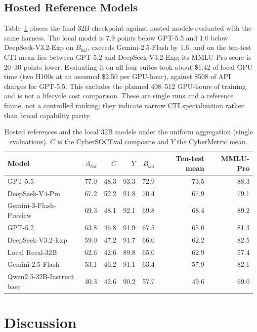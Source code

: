 \documentclass[conference]{IEEEtran}
\begin{document}
\subsection{Hosted Reference Models}
Table~\ref{tab:hosted} places the final 32B checkpoint against hosted models evaluated with the same harness. The local model is 7.9 points below GPT-5.5 and 1.0 below DeepSeek-V3.2-Exp on $B_{bal}$, exceeds Gemini-2.5-Flash by 1.6, and on the ten-test CTI mean lies between GPT-5.2 and DeepSeek-V3.2-Exp; its MMLU-Pro score is 20--30 points lower. Evaluating it on all four suites took about \$1.42 of local GPU time (two H100s at an assumed \$2.50 per GPU-hour), against \$508 of API charges for GPT-5.5. This excludes the planned 408--512 GPU-hours of training and is not a lifecycle cost comparison. These are single runs and a reference frame, not a controlled ranking; they indicate narrow CTI specialization rather than broad capability parity.

\begin{table}[t]
\caption{Hosted references and the local 32B models under the uniform aggregation (single evaluations). $C$ is the CyberSOCEval composite and $Y$ the CyberMetric mean.}
\label{tab:hosted}
\centering
\scriptsize
\setlength{\tabcolsep}{4.0pt}
\begin{tabular}{@{}lrrrrrr@{}}
\toprule
Model & $A_{bal}$ & $C$ & $Y$ & $B_{bal}$ & Ten-test mean & MMLU-Pro \\
\midrule
GPT-5.5 & 77.0 & 48.3 & 93.3 & 72.9 & 73.5 & 88.3 \\
DeepSeek-V4-Pro & 67.2 & 52.2 & 91.8 & 70.4 & 67.9 & 79.1 \\
Gemini-3-Flash-Preview & 69.3 & 48.1 & 92.1 & 69.8 & 68.4 & 89.2 \\
GPT-5.2 & 63.8 & 46.8 & 91.9 & 67.5 & 65.0 & 81.3 \\
DeepSeek-V3.2-Exp & 59.0 & 47.2 & 91.7 & 66.0 & 62.2 & 82.5 \\
Local Recal-32B & 62.6 & 42.6 & 89.8 & 65.0 & 62.9 & 57.4 \\
Gemini-2.5-Flash & 53.1 & 46.2 & 91.1 & 63.4 & 57.9 & 82.1 \\
Qwen2.5-32B-Instruct base & 40.3 & 42.6 & 90.2 & 57.7 & 49.6 & 69.0 \\
\bottomrule
\end{tabular}
\end{table}

\section{Discussion}\label{sec:discussion}
\end{document}
